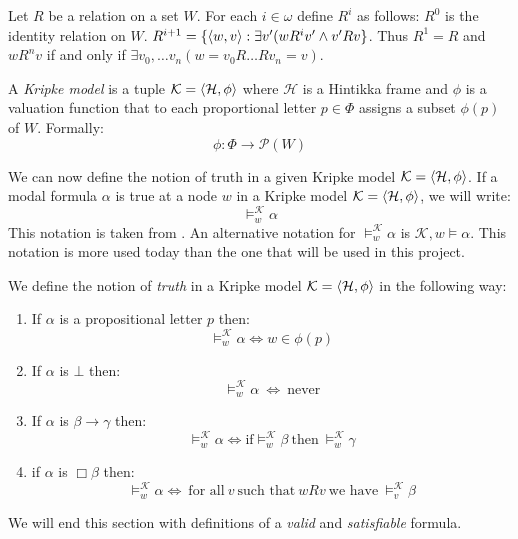 \documentclass[../main.tex]{subfiles}
\begin{document}
\begin{defi}
	Let $R$ be a relation on a set $W$. For each $i\in\omega$ define $R^i$
	as follows: $R^0$ is the identity relation on $W$. $R^{i+1}=\{\langle
	w,v\rangle: \exists v'(wR^iv'\wedge v'Rv\}$. Thus $R^1=R$ and $wR^nv$ if
	and only if $\exists v_0,\ldots v_n(w=v_0R\ldots Rv_n=v)$.
\end{defi}
\begin{defi}
	A \textit{Kripke model} is a tuple $\mathcal{K}=\langle \mathcal{H},\phi\rangle$ where
	$\mathcal{H}$ is a Hintikka frame and $\phi$ is a valuation function that to
	each proportional letter $p\in \Phi$ assigns a subset $\phi(p)$ of $W$.
	Formally:
	\[\phi:\Phi\rightarrow\mathcal{P}(W)\]
\end{defi}
We can now define the notion of truth in a given Kripke model $\mathcal{K}=\langle
\mathcal{H},\phi\rangle$. If a modal formula $\alpha$ is true at a node $w$ in a
Kripke model $\mathcal{K}=\langle \mathcal{H},\phi\rangle$, we will write:
\[\vDash_w^\mathcal{K}\alpha\]
This notation is taken from \citet{Lemmon1977}. An alternative notation for
$\vDash^\mathcal{K}_w\alpha$ is $\mathcal{K},w\vDash\alpha$. This notation is
more used today than the one that will be used in this project.
\begin{defi}
	We define the notion of \textit{truth} in a Kripke model $\mathcal{K}=\langle
	\mathcal{H},\phi\rangle$ in the
	following way:
	\begin{enumerate}
		\item If $\alpha$ is a propositional letter $p$ then:
			\[\vDash_w^\mathcal{K}\alpha \Leftrightarrow w\in\phi(p)\]
		\item If $\alpha$ is $\bot$ then:
			\[\vDash_w^\mathcal{K}\alpha\ \Leftrightarrow\ \text{never} \]
		\item If $\alpha$ is $\beta\rightarrow\gamma$ then:
			\[\vDash_w^\mathcal{K}\alpha \Leftrightarrow \text{if}
				\vDash_w^\mathcal{K}\beta\ \text{then}\
			\vDash_w^\mathcal{K}\gamma\]
		\item if $\alpha$ is $\Box\beta$ then:
			\[\vDash_w^\mathcal{K}\alpha\Leftrightarrow\ \text{for all}\ v\
				\text{such that}\ wRv\ \text{we have}\
			\vDash_v^\mathcal{K}\beta\]
	\end{enumerate}
\end{defi}
We will end this section with definitions of a \textit{valid} and
\textit{satisfiable} formula.
\end{document}
